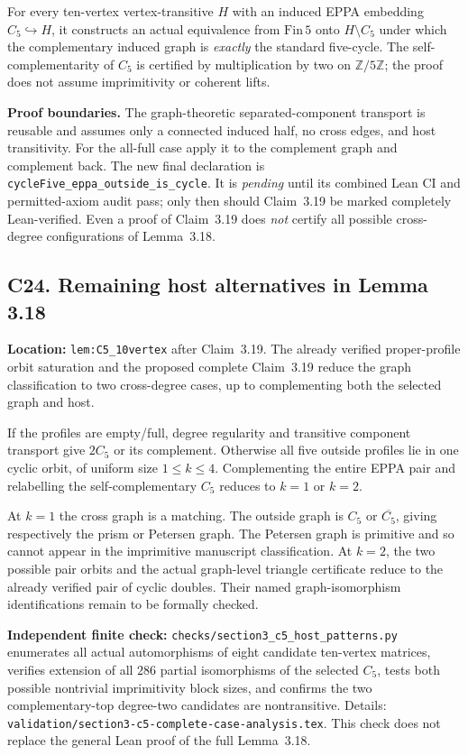 \documentclass[11pt,a4paper]{article}
\begin{document}
For every ten-vertex vertex-transitive \(H\) with an
induced EPPA embedding \(C_5\hookrightarrow H\), it constructs
an actual equivalence from \(\mathrm{Fin}\,5\) onto
\(H\setminus C_5\) under which the complementary induced
graph is \emph{exactly} the standard five-cycle.
The self-complementarity of \(C_5\) is certified
by multiplication by two on \(\mathbb Z/5\mathbb Z\);
the proof does not assume imprimitivity or coherent lifts.

\textbf{Proof boundaries.}
The graph-theoretic separated-component transport is reusable
and assumes only a connected induced half, no cross edges,
and host transitivity. For the all-full case apply it
to the complement graph and complement back.
The new final declaration is
\texttt{cycleFive\_eppa\_outside\_is\_cycle}.
It is \emph{pending} until its combined Lean CI
and permitted-axiom audit pass; only then should
Claim~3.19 be marked completely Lean-verified.
Even a proof of Claim~3.19 does \emph{not} certify
all possible cross-degree configurations of Lemma~3.18.

\subsection*{C24. Remaining host alternatives in Lemma 3.18}
\textbf{Location:} \texttt{lem:C5\_10vertex} after
Claim~3.19. The already verified proper-profile orbit
saturation and the proposed complete Claim~3.19 reduce
the graph classification to two cross-degree cases,
up to complementing both the selected graph and host.

If the profiles are empty/full, degree regularity
and transitive component transport give \(2C_5\)
or its complement. Otherwise all five outside
profiles lie in one cyclic orbit, of uniform size
\(1\le k\le4\). Complementing the entire EPPA pair
and relabelling the self-complementary \(C_5\)
reduces to \(k=1\) or \(k=2\).

At \(k=1\) the cross graph is a matching. The
outside graph is \(C_5\) or \(\overline{C_5}\),
giving respectively the prism or Petersen graph.
The Petersen graph is primitive and so cannot
appear in the imprimitive manuscript classification.
At \(k=2\), the two possible pair orbits and
the actual graph-level triangle certificate
reduce to the already verified pair of cyclic doubles.
Their named graph-isomorphism identifications
remain to be formally checked.

\textbf{Independent finite check:}
\texttt{checks/section3\_c5\_host\_patterns.py}
enumerates all actual automorphisms of eight candidate
ten-vertex matrices, verifies extension of all \(286\)
partial isomorphisms of the selected \(C_5\),
tests both possible nontrivial imprimitivity
block sizes, and confirms the two complementary-top
degree-two candidates are nontransitive.
Details: \texttt{validation/section3-c5-complete-case-analysis.tex}.
This check does not replace the general Lean proof
of the full Lemma~3.18.
\end{document}
